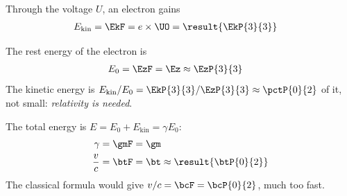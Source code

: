 \begin{abcliste}
\abc Through the voltage $U$, an electron gains
\begin{align}
 E_\mathrm{kin} &= \EkF = e\times\UO = \result{\EkP{3}{3}}
\end{align}

\abc The rest energy of the electron is
\begin{align}
 E_0 &= \EzF = \Ez \approx \EzP{3}{3}
\end{align}
The kinetic energy is $E_\mathrm{kin}/E_0 = \EkP{3}{3}/\EzP{3}{3} \approx \pctP{0}{2}$ of it, not small: \emph{relativity is needed}.

\abc The total energy is $E = E_0 + E_\mathrm{kin} = \gamma E_0$:
\begin{align}
 \gamma &= \gmF = \gm \\
 \frac{v}{c} &= \btF = \bt \approx \result{\btP{0}{2}}
\end{align}
The classical formula would give $v/c = \bcF = \bcP{0}{2}$, much too fast.
\end{abcliste}
